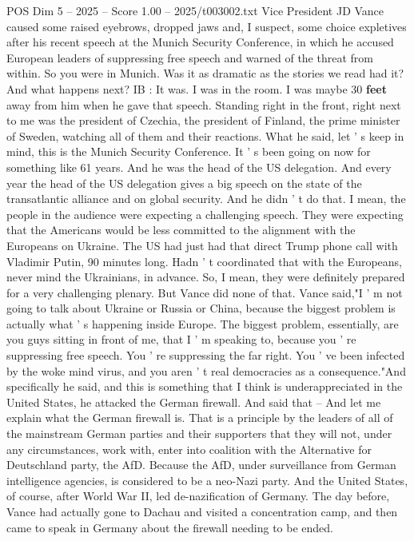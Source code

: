 \begin{textsample}{POS Dim 5 – 2025 – Score 1.00 – 2025/t003002.txt}
Vice President JD Vance caused some raised eyebrows, dropped jaws and, I suspect, some choice expletives after his recent speech at the Munich Security Conference, in which he accused European leaders of suppressing free speech and warned of the threat from within.
So you were in Munich.
Was it as dramatic as the stories we read had it?
And what happens next?
IB : It was.
I was in the room.
I was maybe 30 \textbf{feet} away from him when he gave that speech.
Standing right in the front, right next to me was the president of Czechia, the president of Finland, the prime minister of Sweden, watching all of them and their reactions.
What he said, let ' s keep in mind, this is the Munich Security Conference.
It ' s been going on now for something like 61 years.
And he was the head of the US delegation.
And every year the head of the US delegation gives a big speech on the state of the transatlantic alliance and on global security.
And he didn ' t do that.
I mean, the people in the audience were expecting a challenging speech.
They were expecting that the Americans would be less committed to the alignment with the Europeans on Ukraine.
The US had just had that direct Trump phone call with Vladimir Putin, 90 minutes long.
Hadn ' t coordinated that with the Europeans, never mind the Ukrainians, in advance.
So, I mean, they were definitely prepared for a very challenging plenary.
But Vance did none of that.
Vance said,"I ' m not going to talk about Ukraine or Russia or China, because the biggest problem is actually what ' s happening inside Europe.
The biggest problem, essentially, are you guys sitting in front of me, that I ' m speaking to, because you ' re suppressing free speech.
You ' re suppressing the far right.
You ' ve been infected by the woke mind virus, and you aren ' t real democracies as a consequence."And specifically he said, and this is something that I think is underappreciated in the United States, he attacked the German firewall.
And said that -- And let me explain what the German firewall is.
That is a principle by the leaders of all of the mainstream German parties and their supporters that they will not, under any circumstances, work with, enter into coalition with the Alternative for Deutschland party, the AfD.
Because the AfD, under surveillance from German intelligence agencies, is considered to be a neo-Nazi party.
And the United States, of course, after World War II, led de-nazification of Germany.
The day before, Vance had actually gone to Dachau and visited a concentration camp, and then came to speak in Germany about the firewall needing to be ended.

\end{textsample}
